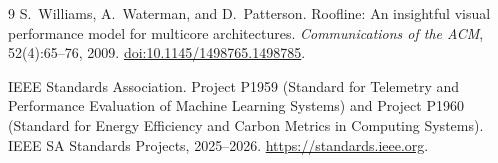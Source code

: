 \documentclass[10pt,a4paper]{article}
\begin{document}
\begin{thebibliography}{9}
S.~Williams, A.~Waterman, and D.~Patterson.
\newblock Roofline: An insightful visual performance model for multicore architectures.
\newblock \emph{Communications of the ACM}, 52(4):65--76, 2009.
\newblock \href{https://doi.org/10.1145/1498765.1498785}{doi:10.1145/1498765.1498785}.

IEEE Standards Association.
\newblock Project P1959 (Standard for Telemetry and Performance Evaluation of Machine Learning Systems) and Project P1960 (Standard for Energy Efficiency and Carbon Metrics in Computing Systems).
\newblock IEEE SA Standards Projects, 2025--2026.
\newblock \href{https://standards.ieee.org}{https://standards.ieee.org}.

\end{thebibliography}
\end{document}
